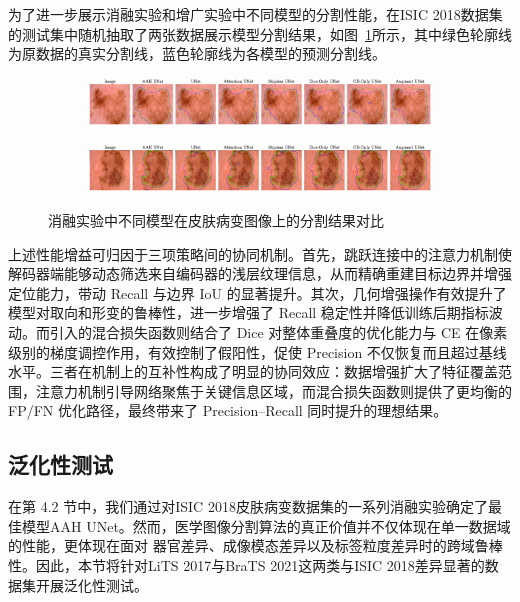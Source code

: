 为了进一步展示消融实验和增广实验中不同模型的分割性能，在ISIC 2018数据集的测试集中随机抽取了两张数据展示模型分割结果，如图~\ref{fig:ablation_results}所示，其中绿色轮廓线为原数据的真实分割线，蓝色轮廓线为各模型的预测分割线。

\begin{figure}[!htbp]
    \centering
    \begin{subfigure}{\linewidth}
        \centering
        \includegraphics[width=\linewidth]{fig/ablation_compare_row1.png}
    \end{subfigure}
    
    \vspace{0.5em}  %

    \begin{subfigure}{\linewidth}
        \centering
        \includegraphics[width=\linewidth]{fig/ablation_compare_row2.png}
    \end{subfigure}

    \caption{消融实验中不同模型在皮肤病变图像上的分割结果对比}
    \label{fig:ablation_results}
\end{figure}

上述性能增益可归因于三项策略间的协同机制。首先，跳跃连接中的注意力机制使解码器端能够动态筛选来自编码器的浅层纹理信息，从而精确重建目标边界并增强定位能力，带动 Recall 与边界 IoU 的显著提升。其次，几何增强操作有效提升了模型对取向和形变的鲁棒性，进一步增强了 Recall 稳定性并降低训练后期指标波动。而引入的混合损失函数则结合了 Dice 对整体重叠度的优化能力与 CE 在像素级别的梯度调控作用，有效控制了假阳性，促使 Precision 不仅恢复而且超过基线水平。三者在机制上的互补性构成了明显的协同效应：数据增强扩大了特征覆盖范围，注意力机制引导网络聚焦于关键信息区域，而混合损失函数则提供了更均衡的 FP/FN 优化路径，最终带来了 Precision–Recall 同时提升的理想结果。

\subsection{泛化性测试}

在第 4.2 节中，我们通过对ISIC 2018皮肤病变数据集的一系列消融实验确定了最佳模型AAH UNet。然而，医学图像分割算法的真正价值并不仅体现在单一数据域的性能，更体现在面对 器官差异、成像模态差异以及标签粒度差异时的跨域鲁棒性。因此，本节将针对LiTS 2017与BraTS 2021这两类与ISIC 2018差异显著的数据集开展泛化性测试。

